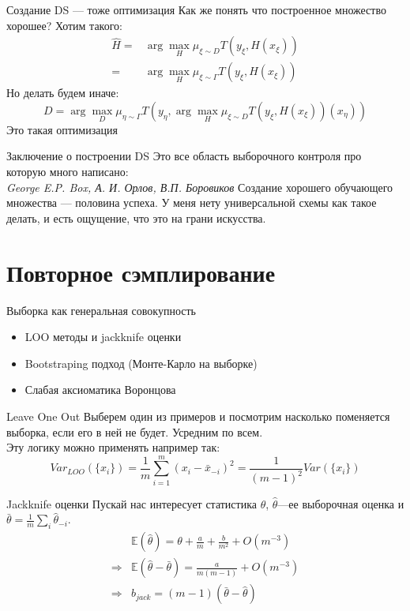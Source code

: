 \documentclass[14pt, fleqn, xcolor={dvipsnames, table}]{beamer}
\begin{document}
\begin{frame}{Создание DS --- тоже оптимизация}
\small
Как же понять что построенное множество хорошее? Хотим такого:
$$\begin{array}{rl}
\hat{H} =& \arg \max_{H} \mu_{\xi \sim D} T(y_{\xi}, H(x_{\xi})) \\
    =& \arg \max_{H} \mu_{\xi \sim \Gamma} T(y_{\xi}, H(x_{\xi}))
\end{array}$$
Но делать будем иначе:
$$
D = \arg \max_{D} \mu_{\eta \sim \Gamma} T(y_{\eta}, \arg \max_{H} \mu_{\xi \sim D} T(y_{\xi}, H(x_{\xi}))(x_\eta))
$$
Это такая оптимизация
\end{frame}

\begin{frame}{Заключение о построении DS}
Это все область выборочного контроля про которую много написано:\\
\textit{George E.P. Box, А. И. Орлов, В.П. Боровиков}
Создание хорошего обучающего множества --- половина успеха. У меня нету универсальной схемы как такое делать, и есть ощущение, что это на грани искусства.
\end{frame}

\section{Повторное сэмплирование}

\begin{frame}{Выборка как генеральная совокупность}
\begin{itemize}
  \item LOO методы и jackknife оценки
  \item Bootstraping подход (Монте-Карло на выборке)
  \item Слабая аксиоматика Воронцова
\end{itemize}
\end{frame}

\begin{frame}{Leave One Out}
Выберем один из примеров и посмотрим насколько поменяется выборка, если его в ней не будет. Усредним по всем.\\
\small
Эту логику можно применять например так:
\normalsize
$$
Var_{LOO}(\{x_i\}) = \frac{1}{m} \sum_{i=1}^m \left(x_i - \bar{x}_{-i}\right)^2 = \frac{1}{(m-1)^2} Var(\{x_i\})
$$

\end{frame}

\begin{frame}{Jackknife оценки}
Пускай нас интересует статистика $\theta$, $\hat{\theta}$---ее выборочная оценка и $\bar{\theta} = \frac{1}{m} \sum_i \hat{\theta}_{-i}$.
$$\begin{array}{rl}
&\mathbb{E}(\hat{\theta}) = \theta + \frac{a}{m} + \frac{b}{m^2} + O(m^{-3}) \\
\Rightarrow & \mathbb{E}(\hat{\theta} - \bar{\theta}) = \frac{a}{m(m-1)} + O(m^{-3}) \\
\Rightarrow & b_{jack} = (m-1)(\bar{\theta} - \hat{\theta})
\end{array}$$
\end{frame}
\end{document}
